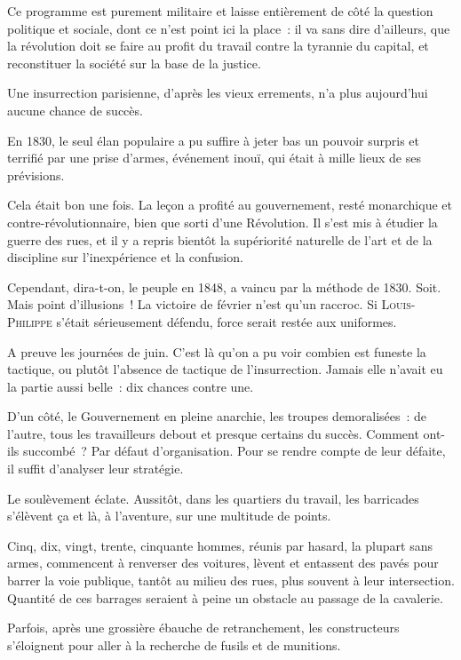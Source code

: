 \documentclass[french,twoside]{book} %
\begin{document}
\noindent Ce programme est purement militaire et laisse entièrement de côté la question politique et sociale, dont ce n’est point ici la place : il va sans dire d’ailleurs, que la révolution doit se faire au profit du travail contre la tyrannie du capital, et reconstituer la société sur la base de la justice.\par
Une insurrection parisienne, d’après les vieux errements, n’a plus aujourd’hui aucune chance de succès.\par
En 1830, le seul élan populaire a pu suffire à jeter bas un pouvoir surpris et terrifié par une prise d’armes, événement inouï, qui était à mille lieux de ses prévisions.\par
Cela était bon une fois. La leçon a profité au gouvernement, resté monarchique et contre-révolutionnaire, bien que sorti d’une Révolution. Il s’est mis à étudier la guerre des rues, et il y a repris bientôt la supériorité naturelle de l’art et de la discipline sur l’inexpérience et la confusion.\par
Cependant, dira-t-on, le peuple en 1848, a vaincu par la méthode de 1830. Soit. Mais point d’illusions ! La victoire de février n’est qu’un raccroc. Si {\scshape Louis-Philippe} s’était sérieusement défendu, force serait restée aux uniformes.\par
A preuve les journées de juin. C'est là qu’on a pu voir combien est funeste la tactique, ou plutôt l’absence de tactique de l’insurrection. Jamais elle n’avait eu la partie aussi belle : dix chances contre une.\par
D'un côté, le Gouvernement en pleine anarchie, les troupes demoralisées : de l’autre, tous les travailleurs debout et presque certains du succès. Comment ont-ils succombé ? Par défaut d’organisation. Pour se rendre compte de leur défaite, il suffit d’analyser leur stratégie.\par
Le soulèvement éclate. Aussitôt, dans les quartiers du travail, les barricades s’élèvent ça et là, à l’aventure, sur une multitude de points.\par
Cinq, dix, vingt, trente, cinquante hommes, réunis par hasard, la plupart sans armes, commencent à renverser des voitures, lèvent et entassent des pavés pour barrer la voie publique, tantôt au milieu des rues, plus souvent à leur intersection. Quantité de ces barrages seraient à peine un obstacle au passage de la cavalerie.\par
Parfois, après une grossière ébauche de retranchement, les constructeurs s’éloignent pour aller à la recherche de fusils et de munitions.\par
\end{document}
